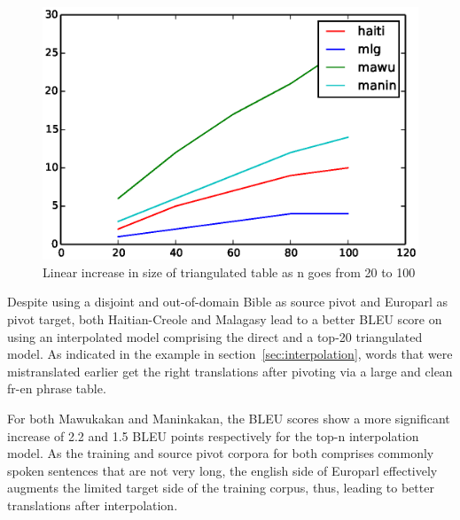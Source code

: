 \begin{figure}[t]
                \small
                \centering
                \includegraphics[scale=0.5]{files/Figures/multiplication_factors.eps}
                \caption{Linear increase in size of triangulated table as n goes from 20 to 100}
                \label{fig:multiplication_factors}

\end{figure}


Despite using a disjoint and out-of-domain Bible as source pivot and Europarl as pivot target, both Haitian-Creole and Malagasy lead to a better BLEU score on using an interpolated model comprising the direct and a top-20 triangulated model. As indicated in the example in section~\ref{sec:interpolation}, words that were mistranslated earlier get the right translations after pivoting via a large and clean fr-en phrase table.

For both Mawukakan and Maninkakan, the BLEU scores show a more significant increase of 2.2 and 1.5 BLEU points respectively for the top-n interpolation model. As the training and source pivot corpora for both comprises commonly spoken sentences that are not very long, the english side of Europarl effectively augments the limited target side of the training corpus, thus, leading to better translations after interpolation.

